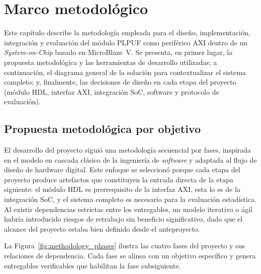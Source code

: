 
\chapter{Marco metodológico}
\label{ch:solucion}

Este capítulo describe la metodología empleada para el diseño,
implementación, integración y evaluación del módulo PLPUF como
periférico AXI dentro de un \textit{System-on-Chip} basado en MicroBlaze~V.
Se presenta, en primer lugar, la propuesta metodológica y las herramientas de
desarrollo utilizadas; a continuación, el diagrama general de la solución
para contextualizar el sistema completo; y, finalmente, las decisiones de
diseño en cada etapa del proyecto (módulo HDL, interfaz AXI, integración SoC,
software y protocolo de evaluación).

\section{Propuesta metodológica por objetivo}
\label{sec:metodologia_obj}

El desarrollo del proyecto siguió una metodología secuencial por fases,
inspirada en el modelo en cascada clásico de la ingeniería de
\textit{software} y adaptada al flujo de diseño de hardware digital. Este
enfoque se seleccionó porque cada etapa del proyecto produce artefactos que
constituyen la entrada directa de la etapa siguiente: el módulo HDL es
prerrequisito de la interfaz AXI, esta lo es de la integración SoC, y el
sistema completo es necesario para la evaluación estadística. Al existir
dependencias estrictas entre los entregables, un modelo iterativo o ágil
habría introducido riesgos de retrabajo sin beneficio significativo, dado que
el alcance del proyecto estaba bien definido desde el anteproyecto.

La Figura~\ref{fig:methodology_phases} ilustra las cuatro fases del proyecto
y sus relaciones de dependencia. Cada fase se alinea con un objetivo
específico y genera entregables verificables que habilitan la fase
subsiguiente.

